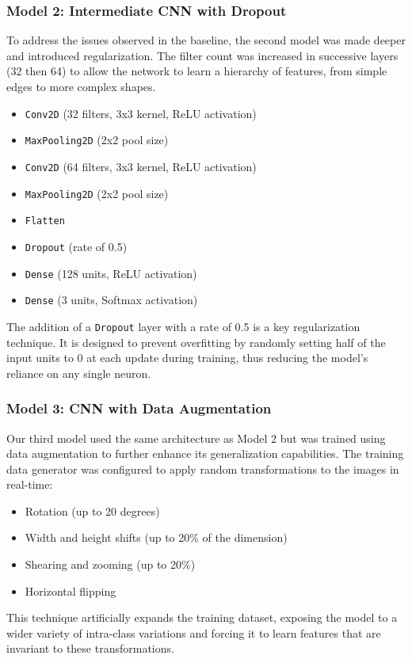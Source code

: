 \documentclass[pdflatex,sn-mathphys-num]{sn-jnl}%
\theoremstyle{thmstyleone}%
\theoremstyle{thmstyletwo}%
\theoremstyle{thmstylethree}%
\begin{document}
\subsubsection{Model 2: Intermediate CNN with Dropout}
To address the issues observed in the baseline, the second model was made deeper and introduced regularization. The filter count was increased in successive layers (32 then 64) to allow the network to learn a hierarchy of features, from simple edges to more complex shapes.
\begin{itemize}
    \item \texttt{Conv2D} (32 filters, 3x3 kernel, ReLU activation)
    \item \texttt{MaxPooling2D} (2x2 pool size)
    \item \texttt{Conv2D} (64 filters, 3x3 kernel, ReLU activation)
    \item \texttt{MaxPooling2D} (2x2 pool size)
    \item \texttt{Flatten}
    \item \texttt{Dropout} (rate of 0.5)
    \item \texttt{Dense} (128 units, ReLU activation)
    \item \texttt{Dense} (3 units, Softmax activation)
\end{itemize}
The addition of a \texttt{Dropout} layer with a rate of 0.5 is a key regularization technique. It is designed to prevent overfitting by randomly setting half of the input units to 0 at each update during training, thus reducing the model's reliance on any single neuron.

\subsubsection{Model 3: CNN with Data Augmentation}
Our third model used the same architecture as Model 2 but was trained using data augmentation to further enhance its generalization capabilities. The training data generator was configured to apply random transformations to the images in real-time:
\begin{itemize}
    \item Rotation (up to 20 degrees)
    \item Width and height shifts (up to 20\% of the dimension)
    \item Shearing and zooming (up to 20\%)
    \item Horizontal flipping
\end{itemize}
This technique artificially expands the training dataset, exposing the model to a wider variety of intra-class variations and forcing it to learn features that are invariant to these transformations.
\end{document}
